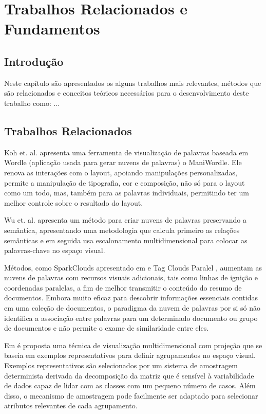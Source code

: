 \chapter{Trabalhos Relacionados e Fundamentos}
\label{cap-trab-relacionados}

\section{Introdução}
\label{intro_trab_relac}

Neste capítulo são apresentados os alguns trabalhos mais relevantes, métodos que são relacionados e conceitos teóricos necessários para o desenvolvimento deste trabalho como:
...

\section{Trabalhos Relacionados}
\label{Trab_Relac}


Koh et. al. \cite{koh2010maniwordle} apresenta uma ferramenta de visualização de palavras baseada em Wordle (aplicação usada para gerar nuvens de palavras) o ManiWordle. Ele renova as interações com o layout, apoiando manipulações personalizadas, permite a manipulação de tipografia, cor e composição, não só para o layout como um todo, mas, também para as palavras individuais, permitindo ter um melhor controle sobre o resultado do layout. 

Wu et. al. \cite{wu2011semantic} apresenta um método para criar nuvens de palavras preservando a semântica, apresentando uma metodologia que calcula primeiro as relações semânticas e em seguida usa escalonamento multidimensional para colocar as palavras-chave no espaço visual.


Métodos, como SparkClouds apresentado em \cite{lee2010sparkclouds} e Tag Clouds Paralel \cite{collins2009parallel}, aumentam as nuvens de palavras com recursos visuais adicionais, tais como linhas de ignição e coordenadas paralelas, a fim de melhor transmitir o conteúdo do resumo de documentos. Embora muito eficaz para descobrir informações essenciais contidas em uma coleção de documentos, o paradigma da nuvem de palavras por si só não identifica a associação entre palavras para um determinado documento ou grupo de documentos e não permite o exame de similaridade entre eles.

Em \cite{joia2015uncovering} é proposta uma técnica de visualização multidimensional com projeção que se baseia em exemplos representativos para definir agrupamentos no espaço visual. Exemplos representativos são selecionados por um sistema de amostragem determinista derivada da decomposição da matriz que é sensível à variabilidade de dados capaz de lidar com as classes com um pequeno número de casos. Além disso, o mecanismo de amostragem pode facilmente ser adaptado para selecionar atributos relevantes de cada agrupamento.

